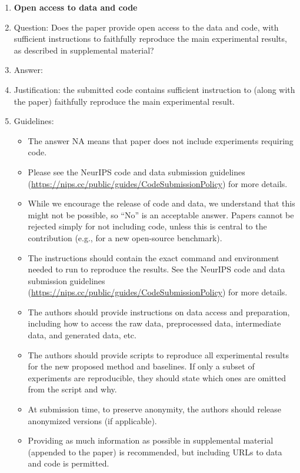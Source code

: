 \documentclass{article}
\begin{document}
\begin{enumerate}
\item {\bf Open access to data and code}
    \item[] Question: Does the paper provide open access to the data and code, with sufficient instructions to faithfully reproduce the main experimental results, as described in supplemental material?
    \item[] Answer: \answerYes{} %
    \item[] Justification: the submitted code contains sufficient instruction to (along with the paper) faithfully reproduce the main experimental result.
    \item[] Guidelines:
    \begin{itemize}
        \item The answer NA means that paper does not include experiments requiring code.
        \item Please see the NeurIPS code and data submission guidelines (\url{https://nips.cc/public/guides/CodeSubmissionPolicy}) for more details.
        \item While we encourage the release of code and data, we understand that this might not be possible, so “No” is an acceptable answer. Papers cannot be rejected simply for not including code, unless this is central to the contribution (e.g., for a new open-source benchmark).
        \item The instructions should contain the exact command and environment needed to run to reproduce the results. See the NeurIPS code and data submission guidelines (\url{https://nips.cc/public/guides/CodeSubmissionPolicy}) for more details.
        \item The authors should provide instructions on data access and preparation, including how to access the raw data, preprocessed data, intermediate data, and generated data, etc.
        \item The authors should provide scripts to reproduce all experimental results for the new proposed method and baselines. If only a subset of experiments are reproducible, they should state which ones are omitted from the script and why.
        \item At submission time, to preserve anonymity, the authors should release anonymized versions (if applicable).
        \item Providing as much information as possible in supplemental material (appended to the paper) is recommended, but including URLs to data and code is permitted.
    \end{itemize}



\end{enumerate}
\end{document}
